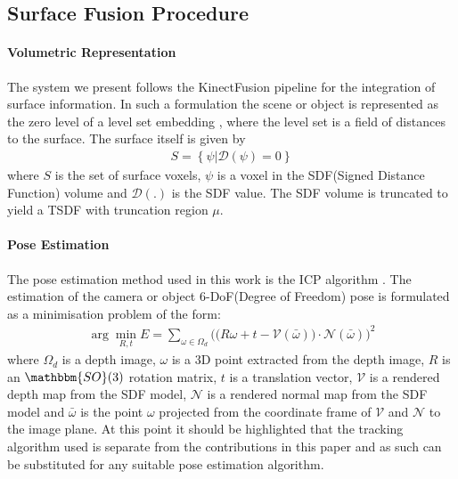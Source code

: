 \subsection{Surface Fusion Procedure}
\paragraph{Volumetric Representation}
The system we present follows the KinectFusion \cite{Newcombe2011} pipeline for the integration of surface information. In such a 
formulation the scene or object is represented as the zero level of a level set embedding \cite{Curless1996}, where the level set is a field of distances 
to the surface. The surface itself is given by
\begin{equation}
	\begin{split}
		S = \left\{\psi | \mathcal{D}(\psi) = 0\right\}
	\end{split}
\end{equation}
where $S$ is the set of surface voxels, $\psi$ is a voxel in the SDF(Signed Distance Function) volume and $\mathcal{D}(.)$ is the SDF value. 
The SDF volume is truncated to yield a TSDF with truncation region $\mu$.

\paragraph{Pose Estimation}
The pose estimation method used in this work is the ICP algorithm \cite{Besl1992}. The estimation of 
the camera or object 6-DoF(Degree of Freedom) pose is formulated as a minimisation problem of the form:
\begin{equation}
	\begin{split}
		\arg \min_{R, t} E = \sum_{\omega \in \Omega_{d}} \bigg( \big( R\omega + t - \mathcal{V}(\bar{\omega}) \big) \cdot \mathcal{N}(\bar{\omega}) \bigg)^{2}
	\end{split}
\end{equation}
where $\Omega_{d}$ is a depth image, $\omega$ is a 3D point extracted from the depth image, $R$ is an  $\mathbbm{SO}(3)$ 
rotation matrix, $t$ is a translation vector, $\mathcal{V}$ is a rendered depth map from the SDF model, $\mathcal{N}$ is a rendered 
normal map from the SDF model and $\bar{\omega}$ is the point $\omega$ projected from the coordinate frame of $\mathcal{V}$ and 
$\mathcal{N}$ to the image plane. At this point it should be highlighted that the tracking algorithm used is separate from the contributions in this paper and 
as such can be substituted for any suitable pose estimation algorithm.

